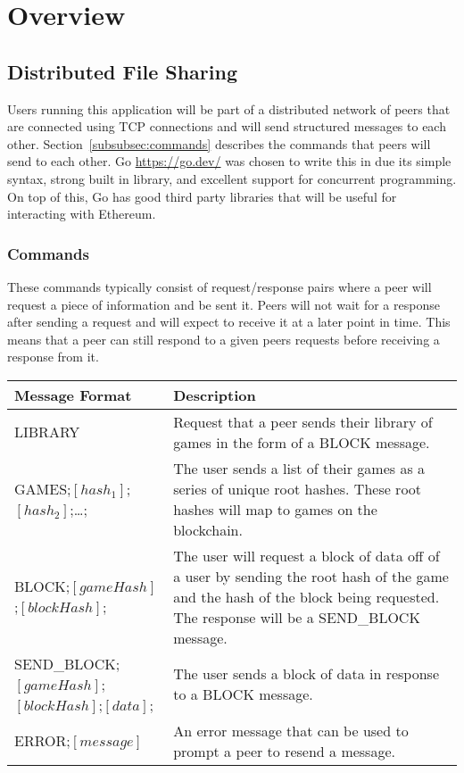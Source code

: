 \section{Overview}

\subsection{Distributed File Sharing}

Users running this application will be part of a distributed network of peers that are connected using TCP connections and will send structured messages to each other. Section~\ref{subsubsec:commands} describes the commands that peers will send to each other.
\x
Go \url{https://go.dev/} was chosen to write this in due its simple syntax, strong built in library, and excellent support for concurrent programming. On top of this, Go has good third party libraries that will be useful for interacting with Ethereum.

\subsubsection*{Commands}
\label{subsubsec:commands}

These commands typically consist of request/response pairs where a peer will request a piece of information and be sent it. Peers will not wait for a response after sending a request and will expect to receive it at a later point in time. This means that a peer can still respond to a given peers requests before receiving a response from it.

\begin{longtable}{p{} p{}}
  \toprule
  \textbf{Message Format} & \textbf{Description}\\
  \midrule\midrule
  LIBRARY
  & Request that a peer sends their library of games in the form of a BLOCK message.\\
  GAMES;$[hash_1]$;$[hash_2]$;\ldots;
  & The user sends a list of their games as a series of unique root hashes. These root hashes will map to games on the blockchain.\\
  \midrule
  BLOCK;$[gameHash]$;$[blockHash]$;
  & The user will request a block of data off of a user by sending the root hash of the game and the hash of the block being requested. The response will be a SEND\_BLOCK message.\\
  SEND\_BLOCK;$[gameHash]$;\newline $[blockHash]$;$[data]$;
  & The user sends a block of data in response to a BLOCK message.\\
  \midrule
  ERROR;$[message]$
  & An error message that can be used to prompt a peer to resend a message.\\
  \bottomrule\bottomrule
\end{longtable}


